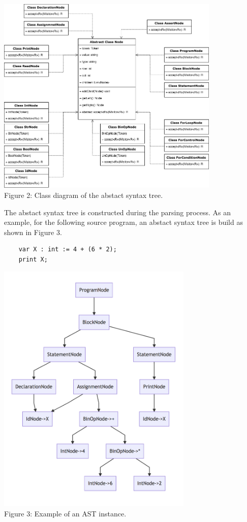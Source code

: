 \documentclass[fleqn]{article}
\begin{document}
{\centering
    \vspace*{1cm} 
    \includegraphics[width=0.8\textwidth]{ast}
    \\Figure 2: Class diagram of the abstact syntax tree.\par
}

\newpage
The abstact syntax tree is constructed during the parsing process. As an example, for the following source program, an abstact syntax tree is build as shown in Figure 3.

\begin{lstlisting}
    var X : int := 4 + (6 * 2);
    print X;
\end{lstlisting} 
 
{\centering
    \vspace*{1cm} 
    \includegraphics[width=0.7\textwidth]{sample1}
    \\Figure 3: Example of an AST instance.\par
}
\end{document}
